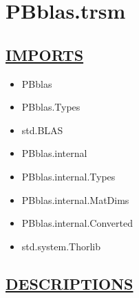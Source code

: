 \chapter*{PBblas.trsm}
\hypertarget{PBblas.trsm}{}

\section*{\underline{IMPORTS}}
\begin{itemize}
\item PBblas
\item PBblas.Types
\item std.BLAS
\item PBblas.internal
\item PBblas.internal.Types
\item PBblas.internal.MatDims
\item PBblas.internal.Converted
\item std.system.Thorlib
\end{itemize}

\section*{\underline{DESCRIPTIONS}}
